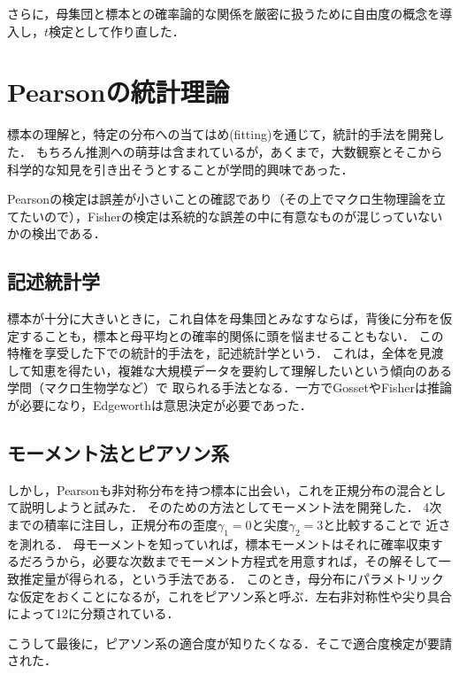 \documentclass[uplatex,dvipdfmx]{jsreport}
\begin{document}
さらに，母集団と標本との確率論的な関係を厳密に扱うために自由度の概念を導入し，$t$検定として作り直した．

\section{Pearsonの統計理論}

\begin{tcolorbox}[colframe=ForestGreen, colback=ForestGreen!10!white,breakable,colbacktitle=ForestGreen!40!white,coltitle=black,fonttitle=\bfseries\sffamily,
title=]
    標本の理解と，特定の分布への当てはめ(fitting)を通じて，統計的手法を開発した．
    もちろん推測への萌芽は含まれているが，あくまで，大数観察とそこから科学的な知見を引き出そうとすることが学問的興味であった．

    Pearsonの検定は誤差が小さいことの確認であり（その上でマクロ生物理論を立てたいので），Fisherの検定は系統的な誤差の中に有意なものが混じっていないかの検出である．
\end{tcolorbox}

\subsection{記述統計学}

標本が十分に大きいときに，これ自体を母集団とみなすならば，背後に分布を仮定することも，標本と母平均との確率的関係に頭を悩ませることもない．
この特権を享受した下での統計的手法を，記述統計学という．
これは，全体を見渡して知恵を得たい，複雑な大規模データを要約して理解したいという傾向のある学問（マクロ生物学など）で
取られる手法となる．一方でGossetやFisherは推論が必要になり，Edgeworthは意思決定が必要であった．

\subsection{モーメント法とピアソン系}

しかし，Pearsonも非対称分布を持つ標本に出会い，これを正規分布の混合として説明しようと試みた．
そのための方法としてモーメント法を開発した．
4次までの積率に注目し，正規分布の歪度$\gamma_1=0$と尖度$\gamma_2=3$と比較することで
近さを測れる．
母モーメントを知っていれば，標本モーメントはそれに確率収束するだろうから，必要な次数までモーメント方程式を用意すれば，その解そして一致推定量が得られる，という手法である．
このとき，母分布にパラメトリックな仮定をおくことになるが，これをピアソン系と呼ぶ．左右非対称性や尖り具合によって12に分類されている．

こうして最後に，ピアソン系の適合度が知りたくなる．そこで適合度検定が要請された．
\end{document}
